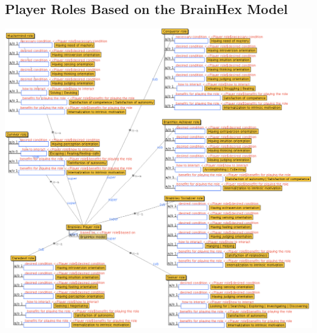 \subsection{Player Roles Based on the BrainHex Model}
\label{sec:player-roles-based-brainhex}
\includegraphics[width=1\textwidth]{images/appendix/player-roles-based-brainhex.png}

\newpage
